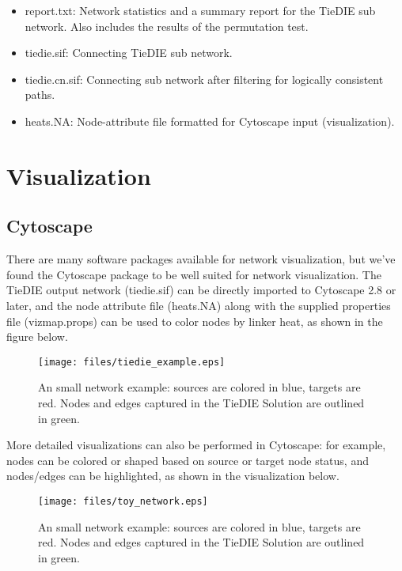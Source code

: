 \documentclass[11pt]{report}
\begin{document}
	\begin{itemize}
	\item report.txt: Network statistics and a summary report for the TieDIE sub network. Also includes the results of the 
	permutation test. 
	\item tiedie.sif: Connecting TieDIE sub network.
	\item tiedie.cn.sif: Connecting sub network after filtering for logically consistent paths. 
	\item heats.NA: Node-attribute file formatted for Cytoscape input (visualization). 
	\end{itemize}

\section{Visualization}

\subsection{Cytoscape}

\noindent There are many software packages available for network visualization, but we've found the Cytoscape package \cite{Cytoscape03} to be well suited for network visualization. The TieDIE output network (tiedie.sif) can be directly imported to Cytoscape 2.8 or later, and the node attribute file (heats.NA) along with the supplied properties file (vizmap.props) can be used to color nodes by linker heat, as shown in the figure below.

\begin{figure}[h]
    \texttt{[image: files/tiedie\_example.eps]}
	\caption{An small network example: sources are colored in blue, targets are red. Nodes and edges captured in the TieDIE Solution are outlined in green.}
    \label{fig:toy_network}
\end{figure}

\clearpage

More detailed visualizations can also be performed in Cytoscape: for example, nodes can be colored or shaped based on source or
target node status, and nodes/edges can be highlighted, as shown in the visualization below. 

\begin{figure}[h]
    \texttt{[image: files/toy\_network.eps]}
	\caption{An small network example: sources are colored in blue, targets are red. Nodes and edges captured in the TieDIE Solution are outlined in green.}
    \label{fig:toy_network}
\end{figure}
\end{document}
